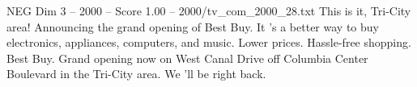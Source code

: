 \begin{textsample}{NEG Dim 3 – 2000 – Score 1.00 – 2000/tv\_com\_2000\_28.txt}  \label{ex:f3_neg_014}
This is it, Tri-City area!
Announcing the grand opening of Best Buy.
It 's a better way to buy electronics, appliances, computers, and music.
Lower prices.
Hassle-free shopping.
Best Buy.
Grand opening now on West Canal Drive off Columbia Center Boulevard in the Tri-City area.
We 'll be right back.

\end{textsample}
